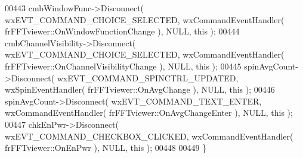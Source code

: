 \begin{DoxyCode}
00443     cmbWindowFunc->Disconnect( wxEVT\_COMMAND\_CHOICE\_SELECTED, wxCommandEventHandler( 
      frFFTviewer::OnWindowFunctionChange ), NULL, \textcolor{keyword}{this} );
00444     cmbChannelVisibility->Disconnect( wxEVT\_COMMAND\_CHOICE\_SELECTED, wxCommandEventHandler( 
      frFFTviewer::OnChannelVisibilityChange ), NULL, \textcolor{keyword}{this} );
00445     spinAvgCount->Disconnect( wxEVT\_COMMAND\_SPINCTRL\_UPDATED, wxSpinEventHandler( 
      frFFTviewer::OnAvgChange ), NULL, \textcolor{keyword}{this} );
00446     spinAvgCount->Disconnect( wxEVT\_COMMAND\_TEXT\_ENTER, wxCommandEventHandler( 
      frFFTviewer::OnAvgChangeEnter ), NULL, \textcolor{keyword}{this} );
00447     chkEnPwr->Disconnect( wxEVT\_COMMAND\_CHECKBOX\_CLICKED, wxCommandEventHandler( 
      frFFTviewer::OnEnPwr ), NULL, \textcolor{keyword}{this} );
00448     
00449 \}
\end{DoxyCode}
